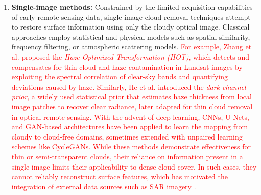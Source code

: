 \begin{enumerate}[label=(\Alph*)]
  \item \textbf{Single-image methods:} Constrained by the limited acquisition capabilities of early remote sensing data, single-image cloud removal techniques attempt to restore surface information using only the cloudy optical image. Classical approaches employ statistical and physical models such as spatial similarity, frequency filtering, or atmospheric scattering models. \textcolor{red}{For example, Zhang et al. \cite{single_variation} proposed the \emph{Haze Optimized Transformation (HOT)}, which detects and compensates for thin cloud and haze contamination in Landsat images by exploiting the spectral correlation of clear-sky bands and quantifying deviations caused by haze. Similarly, He et al. \cite{single_haze_removal_dark_prior} introduced the \emph{dark channel prior}, a widely used statistical prior that estimates haze thickness from local image patches to recover clear radiance, later adapted for thin cloud removal in optical remote sensing. With the advent of deep learning, CNNs, U-Nets, and GAN-based architectures have been applied to learn the mapping from cloudy to cloud-free domains, sometimes extended with unpaired learning schemes like CycleGANs. While these methods demonstrate effectiveness for thin or semi-transparent clouds, their reliance on information present in a single image limits their applicability to dense cloud cover. In such cases, they cannot reliably reconstruct surface features, which has motivated the integration of external data sources such as SAR imagery \cite{CR_Advances_Review_ORS}.}


\end{enumerate}
